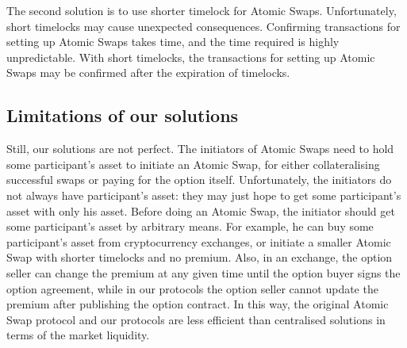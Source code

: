 The second solution is to use shorter timelock for Atomic Swaps.
Unfortunately, short timelocks may cause unexpected consequences.
Confirming transactions for setting up Atomic Swaps takes time, and the time required is highly unpredictable.
With short timelocks, the transactions for setting up Atomic Swaps may be confirmed after the expiration of timelocks.


\subsection{Limitations of our solutions}

Still, our solutions are not perfect.
The initiators of Atomic Swaps need to hold some participant's asset to initiate an Atomic Swap,
for either collateralising successful swaps or paying for the option itself.
Unfortunately, the initiators do not always have participant's asset: they may just hope to get some participant's asset with only his asset.
Before doing an Atomic Swap, the initiator should get some participant's asset by arbitrary means.
For example, he can buy some participant's asset from cryptocurrency exchanges, or initiate a smaller Atomic Swap with shorter timelocks and no premium.
Also, in an exchange, the option seller can change the premium at any given time until the option buyer signs the option agreement, while in our protocols the option seller cannot update the premium after publishing the option contract.
In this way, the original Atomic Swap protocol and our protocols are less efficient than centralised solutions in terms of the market liquidity.